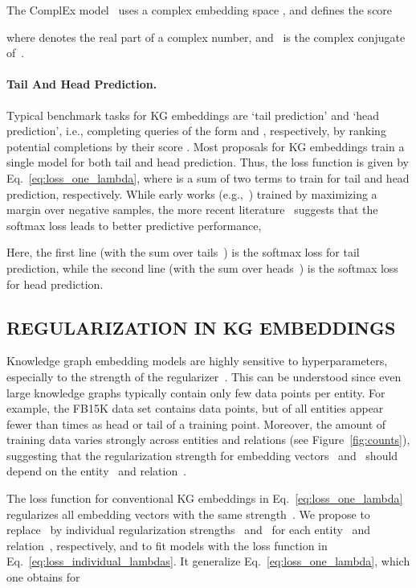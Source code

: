 \documentclass[letterpage]{article}
\begin{document}
The ComplEx model~\citep{TWR2016} uses a complex embedding space , and defines the score

where  denotes the real part of a complex number, and~ is the complex conjugate of~.


\paragraph{Tail And Head Prediction.}
Typical benchmark tasks for KG embeddings are `tail prediction' and `head prediction', i.e., completing queries of the form  and , respectively, by ranking potential completions  by their score .
Most proposals for KG embeddings train a single model for both tail and head prediction.
Thus, the loss function is given by Eq.~\ref{eq:loss_one_lambda}, where  is a sum of two terms to train for tail and head prediction, respectively.
While early works (e.g.,~\citep{BUGWY2013,WZFC2014,BWXJL2015}) trained by maximizing a margin over negative samples, the more recent literature~\citep{KBK2017,LKHJ2018} suggests that the softmax loss leads to better predictive performance,


Here, the first line (with the sum over tails~) is the softmax loss for tail prediction, while the second line (with the sum over heads~) is the softmax loss for head prediction.


\subsection{REGULARIZATION IN KG EMBEDDINGS}
\label{sec:regularization}

Knowledge graph embedding models are highly sensitive to hyperparameters, especially to the strength of the regularizer~\citep{KBK2017}.
This can be understood since even large knowledge graphs typically contain only few data points per entity.
For example, the FB15K data set contains  data points, but  of all entities  appear fewer than  times as head or tail of a training point.
Moreover, the amount of training data varies strongly across entities and relations (see Figure~\ref{fig:counts}), suggesting that the regularization strength for embedding vectors~ and~ should depend on the entity~ and relation~.

The loss function for conventional KG embeddings in Eq.~\ref{eq:loss_one_lambda} regularizes all embedding vectors with the same strength~.
We propose to replace~ by individual regularization strengths~ and~ for each entity~ and relation~, respectively, and to fit models with the loss function in Eq.~\ref{eq:loss_individual_lambdas}.
It generalize Eq.~\ref{eq:loss_one_lambda}, which one obtains for
\end{document}
